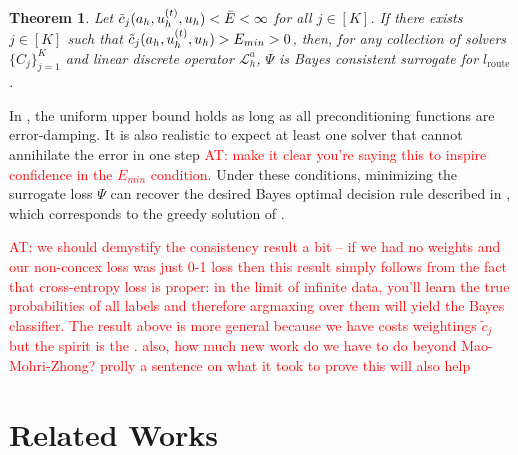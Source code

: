 \documentclass{article} %
\newtheorem{theorem}{Theorem}[section]
\newcommand\ambuj[1]{\textcolor{red}{AT: #1}}
\begin{document}
\begin{theorem} \label{th:consistency}
    Let $\Tilde{c}_j(a_h, u^{(t)}_h, u_h) < \Bar{E} < \infty$  for all $j \in [K]$. If there exists $j\in [K]$ such that $\Tilde{c}_j(a_h, u^{(t)}_h, u_h) > E_{min} > 0$, then, for any collection of solvers $\{C_j\}_{j= 1}^K$ and linear discrete operator $\mathcal{L}_h^a$, $\Psi$ is Bayes consistent surrogate for $l_{\text{route}}$.
\end{theorem}
In , the uniform upper bound holds as long as all preconditioning functions are error-damping. It is also realistic to expect
at least one solver that cannot annihilate the error in one step \ambuj{make it clear you're saying this to inspire confidence in the $E_{min}$ condition}.
Under these conditions,
minimizing the surrogate loss $\Psi$ can recover the desired Bayes optimal decision rule described in , which corresponds to the greedy solution of .

\ambuj{ we should demystify the consistency result a bit -- if we had no weights and our non-concex loss was just 0-1 loss then this result simply follows from the fact that cross-entropy loss is proper: in the limit of infinite data, you'll learn the true probabilities of all labels and therefore argmaxing over them will yield the Bayes classifier. The result above is more general because we have costs weightings $\tilde{c}_j$ but the spirit is the . also, how much new work do we have to do beyond Mao-Mohri-Zhong? prolly a sentence on what it took to prove this will also help}



\section{Related Works}
\end{document}
